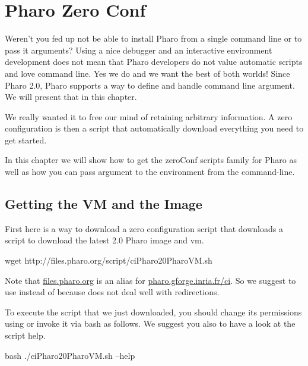 \documentclass[a4paper,10pt,twoside]{book}
\begin{document}
\fi
\sloppy

\chapter{Pharo Zero Conf}


Weren't you fed up not be able to install Pharo from a single command line or to pass it arguments? 
Using a nice debugger and an interactive environment development does not 
mean that Pharo developers do not value automatic scripts and love command line. Yes we do and we want the best of
both worlds!
Since Pharo 2.0, Pharo supports a way to define and handle command line argument. 
We will present that in this chapter. 

We really wanted it to free our mind of retaining arbitrary information. 
A zero configuration is then a script that automatically download everything you need to get started. 

In this chapter we will show how to get the zeroConf scripts family for Pharo as well as how you can 
pass argument to the environment from the command-line.



\section{Getting the VM and the Image}
First here is a way to download a zero configuration script that downloads a script to download the latest 2.0 Pharo image and vm. 

\begin{code}{}
wget http://files.pharo.org/script/ciPharo20PharoVM.sh
\end{code}

Note that \url{files.pharo.org} is an alias for \url{pharo.gforge.inria.fr/ci}. 
So we suggest to use  instead of  because  does not deal well with redirections.

To execute the script that we just downloaded, you should change its  permissions using   or invoke it via bash as follows. We
suggest you also to have a look at the script help.

\begin{code}{}
bash ./ciPharo20PharoVM.sh --help 
\end{code}
\end{document}
